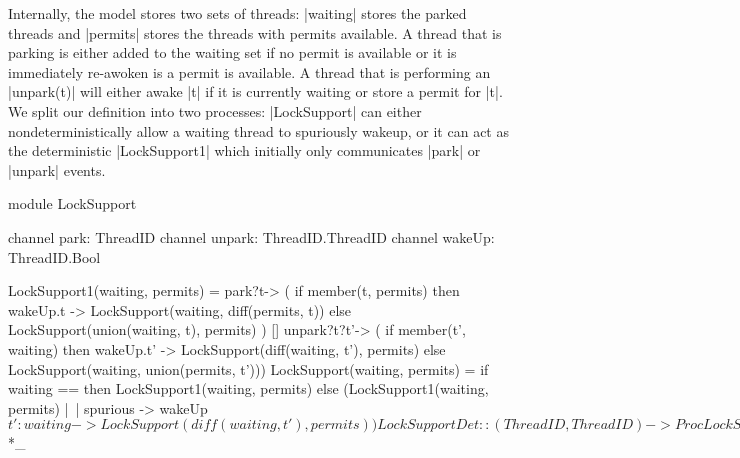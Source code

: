 Internally, the model stores two sets of threads: |waiting| stores the parked threads and |permits| stores the threads with permits available. A thread that is parking is either added to the waiting set if no permit is available or it is immediately re-awoken is a permit is available. A thread that is performing an |unpark(t)| will either awake |t| if it is currently waiting or store a permit for |t|. We split our definition into two processes: |LockSupport| can either nondeterministically allow a waiting thread to spuriously wakeup, or it can act as the deterministic |LockSupport1| which initially only communicates |park| or |unpark| events.

\begin{cspm}[caption={The CSP model of the Java LockSupport module}]
module LockSupport

  channel park: ThreadID
  channel unpark: ThreadID.ThreadID
  channel wakeUp: ThreadID.Bool

  LockSupport1(waiting, permits) =
    park?t-> (
      if member(t, permits)
        then wakeUp.t -> LockSupport(waiting, diff(permits, {t}))
      else LockSupport(union(waiting, {t}), permits) )
    []
    unpark?t?t'-> ( 
      if member(t', waiting)
        then wakeUp.t' -> LockSupport(diff(waiting, {t'}), permits)
      else LockSupport(waiting, union(permits, {t'})))
  LockSupport(waiting, permits) =
    if waiting == {} then LockSupport1(waiting, permits)
    else (LockSupport1(waiting, permits)
          |~| spurious -> wakeUp$t':waiting -> LockSupport(diff(waiting, {t'}), permits))
    

  LockSupportDet :: ({ThreadID}, {ThreadID}) -> Proc
  LockSupportDet(waiting, permits) = LockSupportDet1(waiting, permits)
  LockSupportDet1(waiting, permits) = ... -- Analogous to LockSupport1

exports

  channel spurious

  InitLockSupport = LockSupport({}, {})

  InitLockSupportDet = LockSupportDet({}, {})

  Park(t) = park.t -> wakeUp.t?_ ->  SKIP

  Unpark(t, t') = unpark.t.t' -> SKIP


endmodule _*$*_
\end{cspm}

